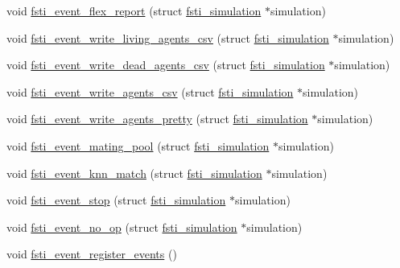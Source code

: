\begin{DoxyCompactItemize}
\item 
void \mbox{\hyperlink{fsti-events_8c_a206a2f2361426e4c10c19a3f3cce41d7}{fsti\+\_\+event\+\_\+flex\+\_\+report}} (struct \mbox{\hyperlink{structfsti__simulation}{fsti\+\_\+simulation}} $\ast$simulation)
\item 
void \mbox{\hyperlink{fsti-events_8c_a465aa2a48afeb4e334293b212ce04758}{fsti\+\_\+event\+\_\+write\+\_\+living\+\_\+agents\+\_\+csv}} (struct \mbox{\hyperlink{structfsti__simulation}{fsti\+\_\+simulation}} $\ast$simulation)
\item 
void \mbox{\hyperlink{fsti-events_8c_a5375a8b4dc64d91ce44f0dfc2d95754a}{fsti\+\_\+event\+\_\+write\+\_\+dead\+\_\+agents\+\_\+csv}} (struct \mbox{\hyperlink{structfsti__simulation}{fsti\+\_\+simulation}} $\ast$simulation)
\item 
void \mbox{\hyperlink{fsti-events_8c_a181109be936c367859d70b6072941f55}{fsti\+\_\+event\+\_\+write\+\_\+agents\+\_\+csv}} (struct \mbox{\hyperlink{structfsti__simulation}{fsti\+\_\+simulation}} $\ast$simulation)
\item 
void \mbox{\hyperlink{fsti-events_8c_a2c63cd8d9c1bfb4dad965bf690654e25}{fsti\+\_\+event\+\_\+write\+\_\+agents\+\_\+pretty}} (struct \mbox{\hyperlink{structfsti__simulation}{fsti\+\_\+simulation}} $\ast$simulation)
\item 
void \mbox{\hyperlink{fsti-events_8c_a6f0f31762c63066de1fcb2fd366d92ff}{fsti\+\_\+event\+\_\+mating\+\_\+pool}} (struct \mbox{\hyperlink{structfsti__simulation}{fsti\+\_\+simulation}} $\ast$simulation)
\item 
void \mbox{\hyperlink{fsti-events_8c_a2dd6b405966a956cbc5f155c4af7b629}{fsti\+\_\+event\+\_\+knn\+\_\+match}} (struct \mbox{\hyperlink{structfsti__simulation}{fsti\+\_\+simulation}} $\ast$simulation)
\item 
void \mbox{\hyperlink{fsti-events_8c_aa1f6896708c9749fd441750168577e61}{fsti\+\_\+event\+\_\+stop}} (struct \mbox{\hyperlink{structfsti__simulation}{fsti\+\_\+simulation}} $\ast$simulation)
\item 
void \mbox{\hyperlink{fsti-events_8c_a0b16ba18abc845d1dea58d355498b991}{fsti\+\_\+event\+\_\+no\+\_\+op}} (struct \mbox{\hyperlink{structfsti__simulation}{fsti\+\_\+simulation}} $\ast$simulation)
\item 
void \mbox{\hyperlink{fsti-events_8c_a0922fc7e9d2a95b59e3f1df672f3bdc4}{fsti\+\_\+event\+\_\+register\+\_\+events}} ()
\end{DoxyCompactItemize}
